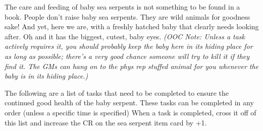 \documentclass[green]{GL2020}
\begin{document}
\name{\gSeaSerpent{}}

The care and feeding of baby sea serpents is not something to be found in a book. People don’t raise baby sea serpents. They are wild animals for goodness sake! And yet, here we are, with a freshly hatched baby that clearly needs looking after. Oh and it has the biggest, cutest, baby eyes. \emph{(OOC Note: Unless a task actively requires it, you should probably keep the baby here in its hiding place for as long as possible; there’s a very good chance someone will try to kill it if they find it. The GMs can hang on to the phys rep stuffed animal for you whenever the baby is in its hiding place.)}

The following are a list of tasks that need to be completed to ensure the continued good health of the baby serpent. These tasks can be completed in any order (unless a specific time is specified) When a task is completed, cross it off of this list and increase the CR on the sea serpent item card by +1.
\end{document}
